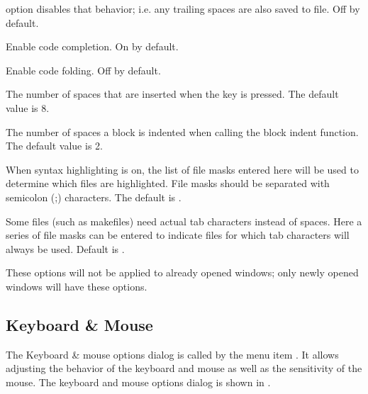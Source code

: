 \begin{description}
option disables that behavior; i.e. any trailing spaces are also saved
to file. Off by default.
\item[Codecomplete enabled]
Enable code completion. On by default.
\item[Enable folds]
Enable code folding. Off by default.
\item[Tab size]
The number of spaces that are inserted when the  key is pressed.
The default value is 8.
\item[Indent size]
The number of spaces a block is indented when calling the block indent function.
The default value is 2.
\item[Highlight extensions]
When syntax highlighting is on, the list of file masks entered here will be
used to determine which files are highlighted. File masks should be
separated with semicolon (;) characters. The default is
.
\item[File patterns needing tabs]
Some files (such as makefiles) need actual tab characters instead of spaces.
Here a series of file masks can be entered to indicate files for which tab 
characters will always be used. Default is .
\end{description}
\begin{remark}
These options will not be applied to already opened windows; only newly
opened windows will have these options.
\end{remark}
%
%
\subsection{Keyboard \& Mouse}
\label{se:prefmouse}
The Keyboard \& mouse options dialog is called by the menu item
. It allows adjusting the behavior of the
keyboard and mouse as well as the sensitivity of the mouse.
The keyboard and mouse options dialog is shown in .


